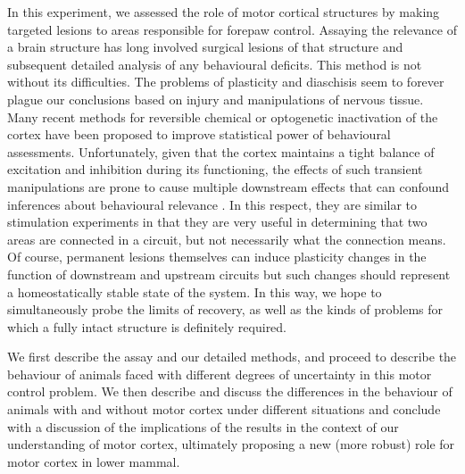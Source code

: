 In this experiment, we assessed the role of motor cortical structures by making targeted lesions to areas responsible for forepaw control. Assaying the relevance of a brain structure has long involved surgical lesions of that structure and subsequent detailed analysis of any behavioural deficits. This method is not without its difficulties. The problems of plasticity and diaschisis seem to forever plague our conclusions based on injury and manipulations of nervous tissue. Many recent methods for reversible chemical or optogenetic inactivation of the cortex have been proposed to improve statistical power of behavioural assessments. Unfortunately, given that the cortex maintains a tight balance of excitation and inhibition during its functioning, the effects of such transient manipulations are prone to cause multiple downstream effects that can confound inferences about behavioural relevance \cite{Otchy2015}. In this respect, they are similar to stimulation experiments in that they are very useful in determining that two areas are connected in a circuit, but not necessarily what the connection means. Of course, permanent lesions themselves can induce plasticity changes in the function of downstream and upstream circuits but such changes should represent a homeostatically stable state of the system. In this way, we hope to simultaneously probe the limits of recovery, as well as the kinds of problems for which a fully intact structure is definitely required.

We first describe the assay and our detailed methods, and proceed to describe the behaviour of animals faced with different degrees of uncertainty in this motor control problem. We then describe and discuss the differences in the behaviour of animals with and without motor cortex under different situations and conclude with a discussion of the implications of the results in the context of our understanding of motor cortex, ultimately proposing a new (more robust) role for motor cortex in lower mammal.
